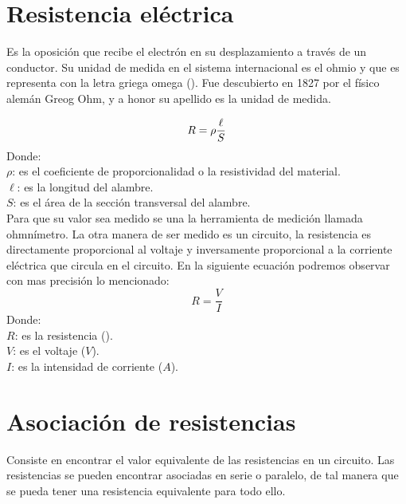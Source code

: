 \section{Resistencia eléctrica}
Es la oposición que recibe el electrón en su desplazamiento a través de un conductor. Su unidad de medida en el sistema internacional es el ohmio y que es representa con la letra griega omega (\textohm). Fue descubierto en 1827 por el físico alemán Greog Ohm, y a honor su apellido es la  unidad de medida.

\begin{equation*} 
	R = \rho\dfrac{\ell}{S}\\	
\end{equation*}
Donde:\\
$ \rho $: es el coeficiente de proporcionalidad o la resistividad del material.\\
$\ell$: es la longitud del alambre.\\
$S$: es el área de la sección transversal del alambre.\\
Para que su valor sea medido se  una la herramienta de medición llamada ohmnímetro. La otra manera de ser medido es un circuito, la resistencia es directamente proporcional al voltaje y inversamente proporcional a la corriente eléctrica que circula en el circuito. En  la siguiente ecuación podremos observar con mas precisión lo mencionado:
\begin{equation*}
	R=\dfrac{V}{I}
\end{equation*}
Donde:\\
$ R $: es la resistencia (\textohm).\\
$ V $: es el voltaje ($V$).\\
$I$: es la intensidad de corriente ($A$).\\
\section{Asociación de resistencias}
Consiste en encontrar el valor equivalente de las resistencias en un circuito. Las resistencias se pueden encontrar asociadas en serie o paralelo, de tal manera que se pueda tener una resistencia equivalente para todo ello.
